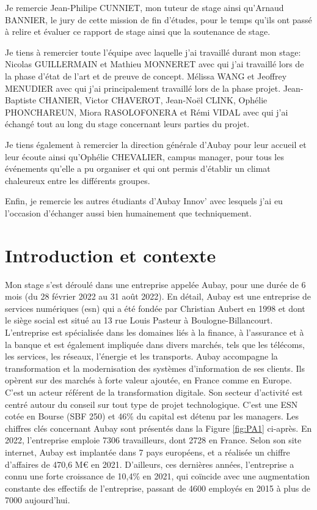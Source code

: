 \documentclass[11pt]{article}
\begin{document}
    Je remercie Jean-Philipe CUNNIET, mon tuteur de stage ainsi qu'Arnaud BANNIER, le jury de cette mission de fin d'études, 
    pour le temps qu'ils ont passé à relire et évaluer ce rapport de stage ainsi que la soutenance de stage.    

    Je tiens à remercier toute l'équipe avec laquelle j'ai 
    travaillé durant mon stage:    
    Nicolas GUILLERMAIN et Mathieu MONNERET avec qui j'ai travaillé lors 
    de la phase d'état de l'art et de preuve de concept.
    Mélissa WANG et Jeoffrey MENUDIER avec qui j'ai principalement 
    travaillé lors de la phase projet. 
    Jean-Baptiste CHANIER, Victor CHAVEROT, Jean-Noël CLINK,
    Ophélie PHONCHAREUN, Miora RASOLOFONERA et Rémi VIDAL avec qui j'ai échangé tout au 
    long du stage concernant leurs parties du projet.       
    
    Je tiens également à remercier la direction générale d'Aubay pour leur accueil et leur écoute ainsi qu'Ophélie CHEVALIER, campus manager, 
    pour tous les événements qu'elle a pu organiser et qui ont permis d'établir un climat chaleureux entre les différents groupes.
        
    Enfin, je remercie les autres étudiants d’Aubay Innov' avec lesquels j'ai eu l'occasion d'échanger aussi bien humainement que techniquement.

  \pagebreak

  \section{Introduction et contexte}    
  
    Mon stage s'est déroulé dans une entreprise appelée Aubay, pour une durée de 6 mois (du 28 février 2022 au 31 août 2022). 
    En détail, Aubay est une entreprise de services numériques (\acrshort{esn}) qui a été fondée par Christian Aubert en 1998 et 
    dont le siège social est situé au 13 rue Louis Pasteur à Boulogne-Billancourt. L'entreprise est spécialisée dans les domaines 
    liés à la finance, à l'assurance et à la banque et est également impliquée dans divers marchés, tels que les télécoms, 
    les services, les réseaux, l'énergie et les transports. Aubay accompagne la transformation et la modernisation des systèmes 
    d’information de ses clients. Ils opèrent sur des marchés à forte valeur ajoutée, en France comme en Europe. C'est un acteur 
    référent de la transformation digitale. Son secteur d'activité est centré autour du conseil sur tout type de projet technologique.  
    C'est une ESN cotée en Bourse (SBF 250) et 46\% du capital est détenu par les managers. Les chiffres clés concernant Aubay 
    sont présentés dans la Figure \ref{fig:PA1} ci-après. En 2022, l'entreprise emploie 7306 travailleurs, dont 2728 en France. 
    Selon son site internet, Aubay est implantée dans 7 pays européens, et a réalisée un chiffre d'affaires de 470,6 M€ en 2021. 
    D'ailleurs, ces dernières années, l'entreprise a connu une forte croissance de 10,4\% en 2021, qui coïncide avec une augmentation 
    constante des effectifs de l'entreprise, passant de 4600 employés en 2015 à plus de 7000 aujourd'hui.
  
\end{document}
